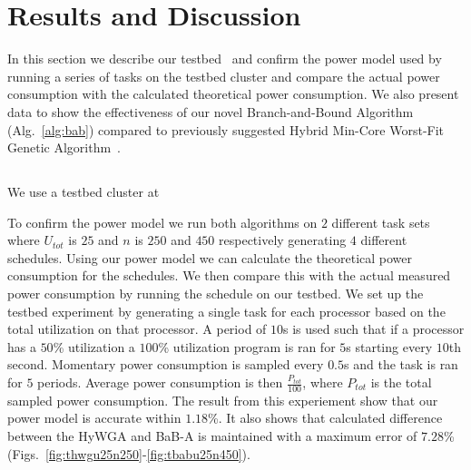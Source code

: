 \documentclass[conference]{IEEEtran}
\begin{document}
\section{Results and Discussion}
\label{sec:rd}

In this section we describe our testbed~\cite{Li12} and confirm the power model used by running a series of tasks on the testbed cluster and compare the actual power consumption with the calculated theoretical power consumption.
We also present data to show the effectiveness of our novel Branch-and-Bound Algorithm (Alg.~\ref{alg:bab}) compared to previously suggested Hybrid Min-Core Worst-Fit Genetic Algorithm~\cite{Saha12}.

\subsection{}
We use a testbed cluster at


To confirm the power model we run both algorithms on $2$ different task sets where $U_{tot}$ is $25$ and $n$ is $250$ and $450$ respectively generating $4$ different schedules. Using our power model we can calculate the theoretical power consumption for the schedules.
We then compare this with the actual measured power consumption by running the schedule on our testbed. We set up the testbed experiment by generating a single task for each processor based on the total utilization on that processor. A period of $10$s is used such that if a processor has a $50$\% utilization a $100$\% utilization program is ran for $5$s starting every $10$th second.
Momentary power consumption is sampled every $0.5$s and the task is ran for $5$ periods. Average power consumption is then $\frac{P_{tot}}{100}$, where $P_{tot}$ is the total sampled power consumption. The result from this experiement show that our power model is accurate within $1.18$\%. It also shows that calculated difference between the HyWGA and BaB-A is maintained with a maximum error of $7.28$\% (Figs.~\ref{fig:thwgu25n250}-\ref{fig:tbabu25n450}).
\end{document}
